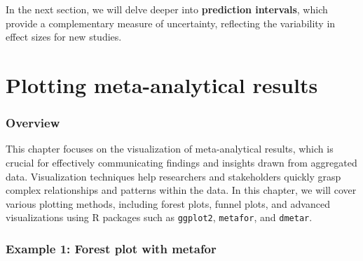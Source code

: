 \documentclass[
]{book}
\begin{document}
In the next section, we will delve deeper into \textbf{prediction intervals}, which provide a complementary measure of uncertainty, reflecting the variability in effect sizes for new studies.

\chapter{Plotting meta-analytical results}\label{plotting-meta-analytical-results}

\subsection{Overview}\label{overview}

This chapter focuses on the visualization of meta-analytical results, which is crucial for effectively communicating findings and insights drawn from aggregated data. Visualization techniques help researchers and stakeholders quickly grasp complex relationships and patterns within the data. In this chapter, we will cover various plotting methods, including forest plots, funnel plots, and advanced visualizations using R packages such as \texttt{ggplot2}, \texttt{metafor}, and \texttt{dmetar}.

\subsection{Example 1: Forest plot with metafor}\label{example-1-forest-plot-with-metafor}
\end{document}
